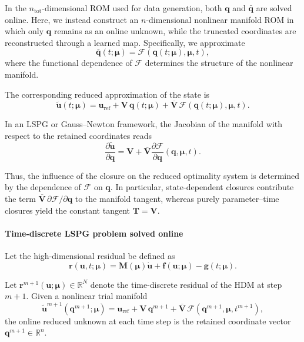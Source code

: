 \documentclass[11pt]{article}
\begin{document}
In the $n_{\text{tot}}$-dimensional ROM used for data generation, both $\mathbf q$ and $\bar{\mathbf q}$ are solved online. Here, we instead construct an $n$-dimensional nonlinear manifold ROM in which only $\mathbf q$ remains as an online unknown, while the truncated coordinates are reconstructed through a learned map. Specifically, we approximate
\begin{equation}
\bar{\mathbf q}(t;\bm\mu)
=
\mathcal F(\mathbf q(t;\bm\mu),\bm\mu,t),
\end{equation}
where the functional dependence of $\mathcal F$ determines the structure of the nonlinear manifold.

The corresponding reduced approximation of the state is
\begin{equation}
\tilde{\mathbf u}(t;\bm\mu)
=
\mathbf u_{\mathrm{ref}}
+
\mathbf V\,\mathbf q(t;\bm\mu)
+
\overline{\mathbf V}\,
\mathcal F(\mathbf q(t;\bm\mu),\bm\mu,t).
\label{eq:nonlinear_manifold}
\end{equation}

In an LSPG or Gauss--Newton framework, the Jacobian of the manifold with respect to the retained coordinates reads
\begin{equation}
\frac{\partial \tilde{\mathbf u}}{\partial \mathbf q}
=
\mathbf V
+
\overline{\mathbf V}
\frac{\partial \mathcal F}{\partial \mathbf q}(\mathbf q,\bm\mu,t).
\label{eq:manifold_jacobian}
\end{equation}

Thus, the influence of the closure on the reduced optimality system is determined by the dependence of $\mathcal F$ on $\mathbf q$. In particular, state-dependent closures contribute the term $\overline{\mathbf V}\,\partial \mathcal F/\partial \mathbf q$ to the manifold tangent, whereas purely parameter--time closures yield the constant tangent $\mathbf T=\mathbf V$.

\paragraph{Time-discrete LSPG problem solved online}

Let the high-dimensional residual be defined as
\begin{equation}
\mathbf r(\mathbf u,t;\bm\mu)
=
\mathbf M(\bm\mu)\dot{\mathbf u}
+
\mathbf f(\mathbf u;\bm\mu)
-
\mathbf g(t;\bm\mu).
\end{equation}

Let $\mathbf r^{m+1}(\mathbf u;\bm\mu)\in\mathbb R^{N}$ denote the time-discrete residual of the HDM at step $m{+}1$. 
Given a nonlinear trial manifold
\[
\tilde{\mathbf u}^{m+1}(\mathbf q^{m+1};\bm\mu)
=
\mathbf u_{\mathrm{ref}}
+
\mathbf V\,\mathbf q^{m+1}
+
\overline{\mathbf V}\,\mathcal F(\mathbf q^{m+1},\bm\mu,t^{m+1}),
\]
the online reduced unknown at each time step is the retained coordinate vector $\mathbf q^{m+1}\in\mathbb R^{n}$.
\end{document}
